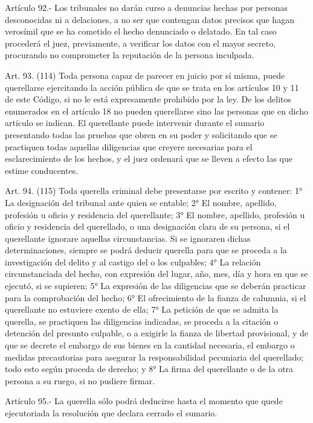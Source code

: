     Artículo 92.- Los tribunales no darán curso a denuncias hechas por personas desconocidas ni a delaciones, a no ser que contengan datos precisos que hagan verosímil que se ha cometido el hecho denunciado o delatado. En tal caso procederá el juez, previamente, a verificar los datos con el mayor secreto, procurando no comprometer la reputación de la persona inculpada.

    Art. 93. (114) Toda persona capaz de parecer en juicio por sí misma, puede querellarse ejercitando la acción pública de que se trata en los artículos 10 y 11 de este Código, si no le está expresamente prohibido por la ley.
    De los delitos enumerados en el artículo 18 no pueden querellarse sino las personas que en dicho artículo se indican.
    El querellante puede intervenir durante el sumario presentando todas las pruebas que obren en su poder y solicitando que se practiquen todas aquellas diligencias que creyere necesarias para el esclarecimiento de los hechos, y el juez ordenará que se lleven a efecto las que estime conducentes.

    Art. 94. (115) Toda querella criminal debe presentarse por escrito y contener:
    1° La designación del tribunal ante quien se entable;
    2° El nombre, apellido, profesión u oficio y residencia del querellante;
    3° El nombre, apellido, profesión u oficio y residencia del querellado, o una designación clara de su persona, si el querellante ignorare aquellas circunstancias. Si se ignoraren dichas determinaciones, siempre se podrá deducir querella para que se proceda a la investigación del delito y al castigo del o los culpables;
    4° La relación circunstanciada del hecho, con expresión del lugar, año, mes, día y hora en que se ejecutó, si se supieren;
    5° La expresión de las diligencias que se deberán practicar para la comprobación del hecho;
    6° El ofrecimiento de la fianza de calumnia, si el querellante no estuviere exento de ella;
    7° La petición de que se admita la querella, se practiquen las diligencias indicadas, se proceda a la citación o detención del presunto culpable, o a exigirle la fianza de libertad provisional, y de que se decrete el embargo de sus bienes en la cantidad necesaria, el embargo o medidas precautorias para asegurar la responsabilidad pecuniaria del querellado; todo esto según proceda de derecho; y
    8° La firma del querellante o de la otra persona a su ruego, si no pudiere firmar.

    Artículo 95.- La querella sólo podrá deducirse hasta el momento que quede ejecutoriada la resolución que declara cerrado el sumario.


